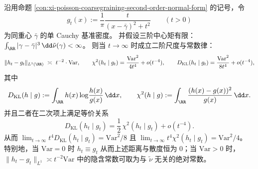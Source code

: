 \begin{proposition}\label{prop:xi-poisson-tv-kl-second-order}
沿用命题 \ref{con:xi-poisson-coarsegraining-second-order-normal-form} 的记号，令
\[
g_t(x):=\frac{1}{\pi}\frac{t}{(x-\bar\gamma)^2+t^2}
\qquad (t>0)
\]
为同重心 \(\bar\gamma\) 的单 Cauchy 基准密度。
并假设三阶中心矩有限：
\(
\int_{\RR}|\gamma-\bar\gamma|^3\,\dd\tilde\nu(\gamma)<\infty
\)。
则当 \(t\to\infty\) 时成立二阶尺度与常数律：
\[
\|h_t-g_t\|_{L^1(\RR)}\ \asymp\ t^{-2}\cdot \mathrm{Var},
\qquad
\chi^2(h_t\mid g_t)=\frac{\mathrm{Var}^2}{4t^4}+o(t^{-4}),
\qquad
D_{\mathrm{KL}}(h_t\mid g_t)=\frac{\mathrm{Var}^2}{8t^4}+o(t^{-4}),
\]
其中
\[
D_{\mathrm{KL}}(h\mid g):=\int_{\RR} h(x)\log\!\frac{h(x)}{g(x)}\,\dd x,
\qquad
\chi^2(h\mid g):=\int_{\RR}\frac{(h(x)-g(x))^2}{g(x)}\,\dd x.
\]
并且二者在二次项上满足等价关系
\[
D_{\mathrm{KL}}(h_t\mid g_t)=\frac12\,\chi^2(h_t\mid g_t)+o(t^{-4}).
\]
从而
\(
\lim_{t\to\infty} t^4D_{\mathrm{KL}}(h_t\mid g_t)=\mathrm{Var}^2/8
\)
且
\(
\lim_{t\to\infty} t^4\chi^2(h_t\mid g_t)=\mathrm{Var}^2/4
\)。
特别地，当 \(\mathrm{Var}=0\) 时 \(h_t\equiv g_t\) 从而上述距离与散度恒为 \(0\)；当 \(\mathrm{Var}>0\) 时，\(\|h_t-g_t\|_{L^1}\asymp t^{-2}\mathrm{Var}\) 中的隐含常数可取为与 \(\tilde\nu\) 无关的绝对常数。
\end{proposition}
